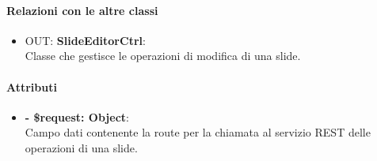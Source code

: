 		\paragraph{Relazioni con le altre classi}
		\begin{itemize}
			\item OUT: \textbf{SlideEditorCtrl}:\\
			Classe che gestisce le operazioni di modifica di una \gls{slide}.
		\end{itemize}
		
		\paragraph{Attributi}
		\begin{itemize}
			\item \textbf{- \$request: Object}:\\
			Campo dati contenente la route per la chiamata al servizio \gls{REST} delle operazioni di una slide.
		\end{itemize}	
		
